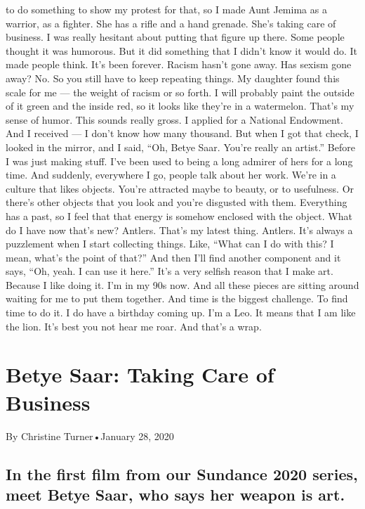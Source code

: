 \begin{itemize}
  to do something to show my protest for that, so I made Aunt Jemima as
  a warrior, as a fighter. She has a rifle and a hand grenade. She's
  taking care of business. I was really hesitant about putting that
  figure up there. Some people thought it was humorous. But it did
  something that I didn't know it would do. It made people think. It's
  been forever. Racism hasn't gone away. Has sexism gone away? No. So
  you still have to keep repeating things. My daughter found this scale
  for me --- the weight of racism or so forth. I will probably paint the
  outside of it green and the inside red, so it looks like they're in a
  watermelon. That's my sense of humor. This sounds really gross. I
  applied for a National Endowment. And I received --- I don't know how
  many thousand. But when I got that check, I looked in the mirror, and
  I said, ``Oh, Betye Saar. You're really an artist.'' Before I was just
  making stuff. I've been used to being a long admirer of hers for a
  long time. And suddenly, everywhere I go, people talk about her work.
  We're in a culture that likes objects. You're attracted maybe to
  beauty, or to usefulness. Or there's other objects that you look and
  you're disgusted with them. Everything has a past, so I feel that that
  energy is somehow enclosed with the object. What do I have now that's
  new? Antlers. That's my latest thing. Antlers. It's always a
  puzzlement when I start collecting things. Like, ``What can I do with
  this? I mean, what's the point of that?'' And then I'll find another
  component and it says, ``Oh, yeah. I can use it here.'' It's a very
  selfish reason that I make art. Because I like doing it. I'm in my 90s
  now. And all these pieces are sitting around waiting for me to put
  them together. And time is the biggest challenge. To find time to do
  it. I do have a birthday coming up. I'm a Leo. It means that I am like
  the lion. It's best you not hear me roar. And that's a wrap.
\end{itemize}

\hypertarget{betye-saar-taking-care-of-business-1}{%
\section{Betye Saar: Taking Care of
Business}\label{betye-saar-taking-care-of-business-1}}

By Christine Turner•January 28, 2020

\hypertarget{in-the-first-film-from-our-sundance-2020-series-meet-betye-saar-who-says-her-weapon-is-art-1}{%
\subsection{In the first film from our Sundance 2020 series, meet Betye
Saar, who says her weapon is
art.}\label{in-the-first-film-from-our-sundance-2020-series-meet-betye-saar-who-says-her-weapon-is-art-1}}

